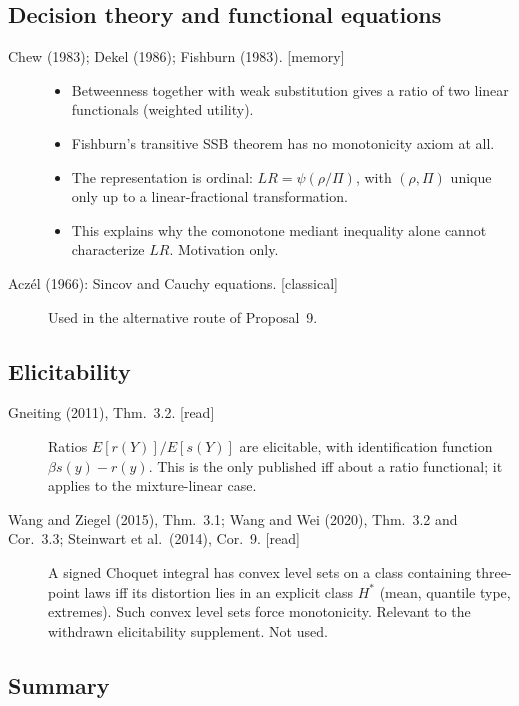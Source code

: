 \subsection{Decision theory and functional equations}

\begin{description}
\item[Chew (1983); Dekel (1986); Fishburn (1983). {[memory]}]
  \begin{itemize}
  \item Betweenness together with weak substitution gives a ratio of two linear functionals (weighted utility).
  \item Fishburn's transitive SSB theorem has no monotonicity axiom at all.
  \item The representation is ordinal: $LR=\psi(\rho/\Pi)$, with $(\rho,\Pi)$ unique only up to a linear-fractional transformation.
  \item This explains why the comonotone mediant inequality alone cannot characterize $LR$. Motivation only.
  \end{itemize}
\item[Acz\'el (1966): Sincov and Cauchy equations. {[classical]}] Used in the alternative route of Proposal~9.
\end{description}

\subsection{Elicitability}

\begin{description}
\item[Gneiting (2011), Thm.~3.2. {[read]}] Ratios $E[r(Y)]/E[s(Y)]$ are elicitable, with identification function $\beta s(y)-r(y)$. This is the only published iff about a ratio functional; it applies to the mixture-linear case.
\item[Wang and Ziegel (2015), Thm.~3.1; Wang and Wei (2020), Thm.~3.2 and Cor.~3.3; Steinwart et al.\ (2014), Cor.~9. {[read]}] A signed Choquet integral has convex level sets on a class containing three-point laws iff its distortion lies in an explicit class $H^*$ (mean, quantile type, extremes). Such convex level sets force monotonicity. Relevant to the withdrawn elicitability supplement. Not used.
\end{description}

\subsection{Summary}


